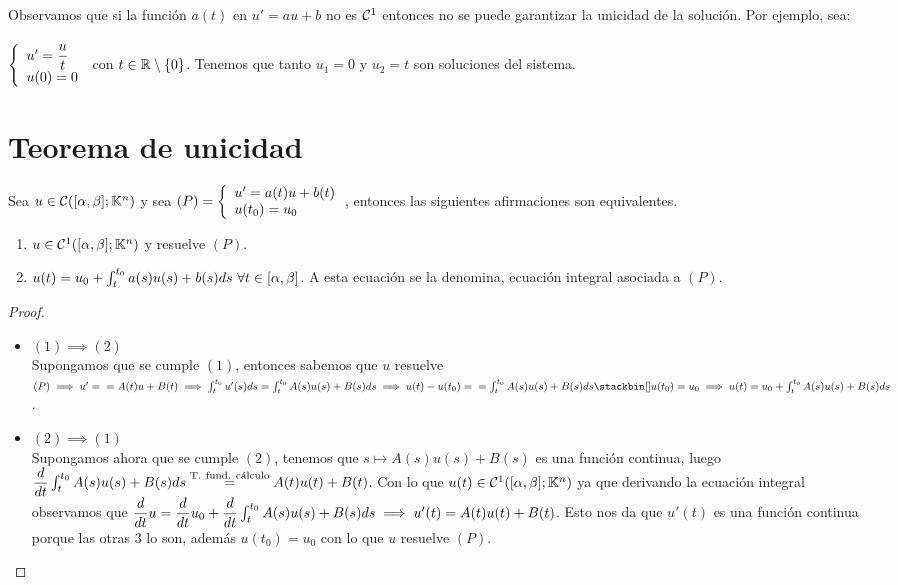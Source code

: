 \begin{observacion} Observamos que si la función $a(t)$ en $u'=au + b$ no es  $\Cgot^1$ entonces no se puede garantizar la unicidad de la solución. Por ejemplo, sea:\\\\
$\doubleleft{u'=\dfrac{u}{t} }{u(0)=0}$ con $t \in \R \setminus\{0\}$. Tenemos que tanto $u_1=0$ y $u_2=t$ son soluciones del sistema.
\end{observacion}


\section{Teorema de unicidad}

\begin{lema}
Sea $u \in \Cgot(\alphabeta;\K^n)$ y sea $(P)=\doubleleft{u'=a(t)u +b(t)}{u(t_0)=u_0}$, entonces las siguientes afirmaciones son equivalentes.
\begin{enumerate}[1)]
\item $u \in \Cgot^1([\alpha,\beta];\K^n)$ y resuelve $(P)$.
\item $u(t)= u_0 + \inte{t_0}{t} a(s)u(s) +b(s) ds\ \forall t \in \alphabeta$. A esta ecuación se la denomina, ecuación integral asociada a $(P)$.
\end{enumerate}
\begin{proof}\ 
\begin{itemize}
\item $(1)\implies(2)$\\
Supongamos que se cumple $(1)$, entonces sabemos que $u$ resuelve $(P) \implies u'=\\
= A(t)u + B(t) \implies \inte{t_0}{t}u'(s)ds = \inte{t_0}{t}A(s)u(s) + B(s) ds \implies u(t)- u(t_0) =\\= \inte{t_0}{t}A(s)u(s) + B(s) ds \ximplies{u(t_0)=u_0}{} u(t)= u_0 + \inte{t_0}{t}A(s)u(s) + B(s) ds$.
\item $(2)\implies(1)$\\
Supongamos ahora que se cumple $(2)$, tenemos que $s \mapsto A(s)u(s)+B(s)$ es una función continua, luego $\dfrac{d}{dt}\inte{t_0}{t}A(s)u(s) + B(s)ds \overset{\mathrm{T.\ fund.\ c\acute{a}lculo}}= A(t)u(t)+B(t)$. Con lo que $u(t)\in \Cgot^1(\alphabeta;\K^n)$ ya que derivando la ecuación integral observamos que $\dfrac{d}{dt}u=\dfrac{d}{dt}u_0 + \dfrac{d}{dt}\inte{t_0}{t}A(s)u(s) + B(s)ds \implies u'(t)= A(t)u(t)+B(t)$. Esto nos da que $u'(t)$ es una función continua porque las otras 3 lo son, además $u(t_0)=u_0$ con lo que $u$ resuelve $(P)$.
\end{itemize}
\end{proof}  
\end{lema}

